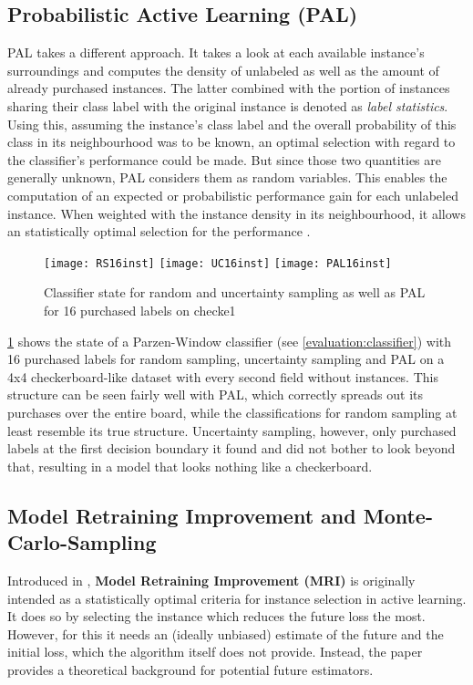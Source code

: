 \subsection{Probabilistic Active Learning (PAL)}
PAL takes a different approach. It takes a look at each available instance's surroundings and computes the density of unlabeled as well as the amount of already purchased instances. The latter combined with the portion of instances sharing their class label with the original instance is denoted as \textit{label statistics}. Using this, assuming the instance's class label and the overall probability of this class in its neighbourhood was to be known, an optimal selection with regard to the classifier's performance could be made. But since those two quantities are generally unknown, PAL considers them as random variables. This enables the computation of an expected or probabilistic performance gain for each unlabeled instance. When weighted with the instance density in its neighbourhood, it allows an statistically optimal selection for the performance \cite{KremplEtAl2014}.

\begin{figure}[h]
	\centering
	\texttt{[image: RS16inst]}
	\texttt{[image: UC16inst]}
	\texttt{[image: PAL16inst]}
	\caption{Classifier state for random and uncertainty sampling as well as PAL for 16 purchased labels on checke1}
	\label{fig:ALillustration}
\end{figure}

\ref{fig:ALillustration} shows the state of a Parzen-Window classifier (see \ref{evaluation:classifier}) with 16 purchased labels for random sampling, uncertainty sampling and PAL on a 4x4 checkerboard-like dataset with every second field without instances. This structure can be seen fairly well with PAL, which correctly spreads out its purchases over the entire board, while the classifications for random sampling at least resemble its true structure. Uncertainty sampling, however, only purchased labels at the first decision boundary it found and did not bother to look beyond that, resulting in a model that looks nothing like a checkerboard.

\subsection{Model Retraining Improvement and Monte-Carlo-Sampling}
Introduced in \cite{EvansEtAl2015}, \textbf{Model Retraining Improvement (MRI)} is originally intended as a statistically optimal criteria for instance selection in active learning. It does so by selecting the instance which reduces the future loss the most. However, for this it needs an (ideally unbiased) estimate of the future and the initial loss, which the algorithm itself does not provide. Instead, the paper provides a theoretical background for potential future estimators.

